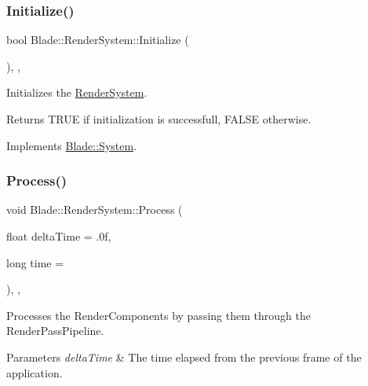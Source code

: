 \subsubsection{\texorpdfstring{Initialize()}{Initialize()}}
{\footnotesize\ttfamily bool Blade\+::\+Render\+System\+::\+Initialize (\begin{DoxyParamCaption}{ }\end{DoxyParamCaption})\hspace{0.3cm}{\ttfamily [override]}, {\ttfamily [virtual]}, {\ttfamily [noexcept]}}



Initializes the \hyperlink{class_blade_1_1_render_system}{Render\+System}. 

\begin{DoxyReturn}{Returns}
T\+R\+UE if initialization is successfull, F\+A\+L\+SE otherwise. 
\end{DoxyReturn}


Implements \hyperlink{class_blade_1_1_system_a63fa00af40dc54d093300eff4785f26f}{Blade\+::\+System}.

\mbox{\label{class_blade_1_1_render_system_a8edd0d0c9d5d54c395a03f98f6b16fb9}} 
\subsubsection{\texorpdfstring{Process()}{Process()}}
{\footnotesize\ttfamily void Blade\+::\+Render\+System\+::\+Process (\begin{DoxyParamCaption}\item[{float}]{delta\+Time = {\ttfamily .0f},  }\item[{long}]{time = {} }\end{DoxyParamCaption})\hspace{0.3cm}{\ttfamily [override]}, {\ttfamily [virtual]}, {\ttfamily [noexcept]}}



Processes the Render\+Components by passing them through the Render\+Pass\+Pipeline. 


\begin{DoxyParams}{Parameters}
{\em delta\+Time} & The time elapsed from the previous frame of the application. \\
\hline
\end{DoxyParams}


